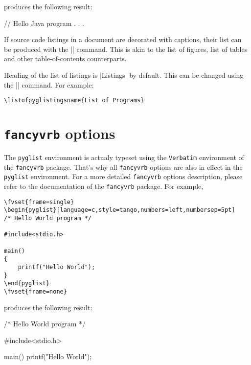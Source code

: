 \documentclass{article}
\begin{document}
produces the following result:

\begin{pyglist}[language=java,caption={First Java program},%
       listingnamefont=\sffamily\bfseries\color{yellow},%
       captionfont=\sffamily\color{white},captionbgcolor=gray,fontsize=\MacroFont]
// Hello Java program
      .
      .
      .
\end{pyglist}

\bigskip
\DescribeMacro{\listofpyglistings}
If source code listings in a document are decorated with captions, their list can be produced with the |\listofpyglistings| command. This is akin to the list of figures, list of tables and other table-of-contents counterparts.

\bigskip
\DescribeMacro{\listofpyglistingsname}
Heading of the list of listings is |Listings| by default. This can be changed using the |\listofpyglistingsname| command. For example:

\begin{verbatim}
\listofpyglistingsname{List of Programs}
\end{verbatim}

\section{\texttt{fancyvrb} options}

The \texttt{pyglist} environment is actualy typeset using the \texttt{Verbatim} environment of the \texttt{fancyvrb} package. That's why all \texttt{fancyvrb} options are also in effect in the \texttt{pyglist} environment. For a more detailed \texttt{fancyvrb} options description, please refer to the documentation of the \texttt{fancyvrb} package. For example,

\begin{verbatim}
\fvset{frame=single}
\begin{pyglist}[language=c,style=tango,numbers=left,numbersep=5pt]
/* Hello World program */

#include<stdio.h>

main()
{
    printf("Hello World");
}
\end{pyglist}
\fvset{frame=none}
\end{verbatim}

produces the following result:

\bigskip
{}
\begin{pyglist}[language=c,style=tango,numbers=left,numbersep=5pt,fontsize=\MacroFont]
/* Hello World program */

#include<stdio.h>

main()
{
    printf("Hello World");
}
\end{pyglist}
\end{document}
